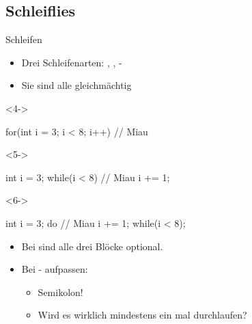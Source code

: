 {\subsection{Schleiflies}
\begin{frame}[fragile]{Schleifen}
   \vspace*{-.75\baselineskip}\begin{itemize}[<+(1)->]
      \itemsep5pt
      \item Drei Schleifenarten: , , -
      \item Sie sind alle gleichmächtig\vspace*{-7.125\baselineskip}
   \end{itemize}
\begin{layout-imageonly}
\columns[onlytextwidth,t]
\begin{uncoverenv}<4->
\begin{plainjava}
for(int i = 3; i < 8; i++) {
   // Miau
}
\end{plainjava}
\end{uncoverenv}
\begin{uncoverenv}<5->
\begin{plainjava}
int i = 3;
while(i < 8) {
   // Miau
   i += 1;
}
\end{plainjava}
\end{uncoverenv}
\begin{uncoverenv}<6->
\begin{plainjava}
int i = 3;
do {
   // Miau
   i += 1;
} while(i < 8);
\end{plainjava}
\end{uncoverenv}
\endcolumns
\columns[onlytextwidth,c]
\endcolumns
\vspace*{-6.4\baselineskip}
\end{layout-imageonly}
\begin{itemize}
   \itemsep5pt
   \item<10-> Bei  sind alle drei Blöcke optional.
   \item<11-> Bei - aufpassen: \begin{itemize}
      \item<12-> Semikolon!
      \item<13-> Wird es wirklich mindestens ein mal durchlaufen?
   \end{itemize}
\end{itemize}
\end{frame}


}
